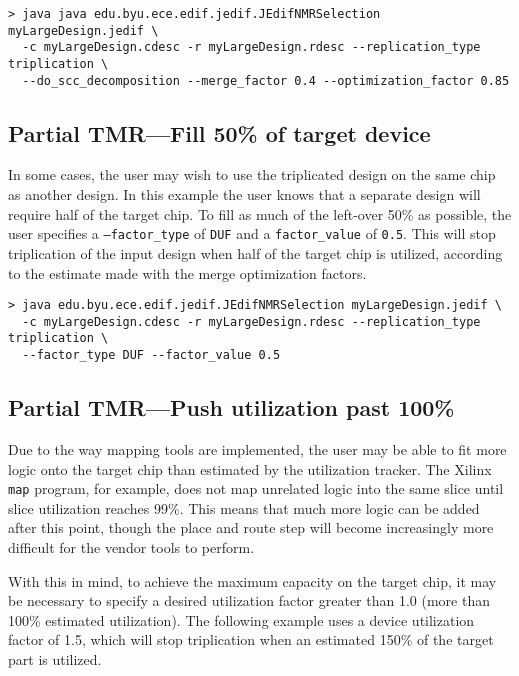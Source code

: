 \begin{verbatim}
> java java edu.byu.ece.edif.jedif.JEdifNMRSelection myLargeDesign.jedif \
  -c myLargeDesign.cdesc -r myLargeDesign.rdesc --replication_type triplication \
  --do_scc_decomposition --merge_factor 0.4 --optimization_factor 0.85
\end{verbatim}

\subsection{Partial TMR---Fill 50\% of target device}
In some cases, the user may wish to use the triplicated design on the same chip 
as another design. In this example the user knows that a separate design will 
require half of the target chip. To fill as much of the left-over 50\% as 
possible, the user specifies a \texttt{--factor\_type} of \texttt{DUF} and a 
\texttt{factor\_value} of \texttt{0.5}. This will stop triplication of the 
input design when half of the target chip is utilized, according to the 
estimate made with the merge optimization factors.

\begin{verbatim}
> java edu.byu.ece.edif.jedif.JEdifNMRSelection myLargeDesign.jedif \
  -c myLargeDesign.cdesc -r myLargeDesign.rdesc --replication_type triplication \
  --factor_type DUF --factor_value 0.5
\end{verbatim}

\subsection{Partial TMR---Push utilization past 100\%}
Due to the way mapping tools are implemented, the user may be able to fit more 
logic onto the target chip than estimated by the utilization tracker. The 
Xilinx \texttt{map} program, for example, does not map unrelated logic into the 
same slice until slice utilization reaches 99\%. This means that much more 
logic can be added after this point, though the place and route step will 
become increasingly more difficult for the vendor tools to perform.

With this in mind, to achieve the maximum capacity on the target chip, it may 
be necessary to specify a desired utilization factor greater than 1.0 (more 
than 100\% estimated utilization). The following example uses a device 
utilization factor of 1.5, which will stop triplication when an estimated 150\% 
of the target part is utilized.

